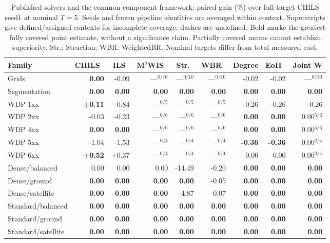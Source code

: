 \begin{table}[!t]
\centering
\small
\setlength{\tabcolsep}{3pt}
\caption{Published solvers and the common-component framework: paired gain (\%) over full-target CHILS seed1 at nominal $T=5$. Seeds and frozen pipeline identities are averaged within context. Superscripts give defined/assigned contexts for incomplete coverage; dashes are undefined. Bold marks the greatest fully covered point estimate, without a significance claim. Partially covered means cannot establish superiority. Str.: Struction; WBR: WeightedBR. Nominal targets differ from total measured cost.}
\label{tab:v06-published}
\begin{tabular}{lrrrrrrrr}
\toprule
Family & CHILS~\cite{grossmann2025chils} & ILS~\cite{grossmann2025chils} & M$^2$WIS~\cite{grossmann2024mmwis} & Str.~\cite{gellner2021struction} & WBR~\cite{lamm2019weighted} & Degree & EoH~\cite{liu2024eoh} & Joint W\\
\midrule
Grids & \textbf{0.00} & -0.09 & ---$^{0/10}$ & ---$^{0/10}$ & ---$^{0/10}$ & -0.02 & -0.02 & ---$^{0/10}$\\
Segmentation & \textbf{0.00} & \textbf{0.00} & \textbf{0.00} & \textbf{0.00} & \textbf{0.00} & \textbf{0.00} & \textbf{0.00} & \textbf{0.00}\\
WDP 1xx & \textbf{+0.11} & -0.84 & ---$^{0/5}$ & ---$^{0/5}$ & ---$^{0/5}$ & -0.26 & -0.26 & -0.26\\
WDP 2xx & -0.03 & -0.23 & ---$^{0/6}$ & ---$^{0/6}$ & ---$^{0/6}$ & \textbf{0.00} & \textbf{0.00} & 0.00$^{5/6}$\\
WDP 4xx & \textbf{0.00} & \textbf{0.00} & ---$^{0/6}$ & ---$^{0/6}$ & ---$^{0/6}$ & \textbf{0.00} & \textbf{0.00} & 0.00$^{5/6}$\\
WDP 5xx & -1.04 & -1.53 & ---$^{0/4}$ & ---$^{0/4}$ & ---$^{0/4}$ & \textbf{-0.36} & \textbf{-0.36} & 0.00$^{2/4}$\\
WDP 6xx & \textbf{+0.52} & +0.37 & ---$^{0/4}$ & ---$^{0/4}$ & ---$^{0/4}$ & 0.00 & 0.00 & 0.00$^{3/4}$\\
Dense/balanced & 0.00 & 0.00 & 0.00 & -14.49 & -0.20 & \textbf{0.00} & \textbf{0.00} & \textbf{0.00}\\
Dense/ground & \textbf{0.00} & \textbf{0.00} & \textbf{0.00} & \textbf{0.00} & -0.05 & \textbf{0.00} & \textbf{0.00} & \textbf{0.00}\\
Dense/satellite & \textbf{0.00} & \textbf{0.00} & \textbf{0.00} & -4.87 & -0.07 & \textbf{0.00} & \textbf{0.00} & \textbf{0.00}\\
Standard/balanced & \textbf{0.00} & \textbf{0.00} & \textbf{0.00} & \textbf{0.00} & \textbf{0.00} & \textbf{0.00} & \textbf{0.00} & \textbf{0.00}\\
Standard/ground & \textbf{0.00} & \textbf{0.00} & \textbf{0.00} & \textbf{0.00} & \textbf{0.00} & \textbf{0.00} & \textbf{0.00} & \textbf{0.00}\\
Standard/satellite & \textbf{0.00} & \textbf{0.00} & \textbf{0.00} & \textbf{0.00} & \textbf{0.00} & \textbf{0.00} & \textbf{0.00} & \textbf{0.00}\\
\bottomrule
\end{tabular}
\end{table}

